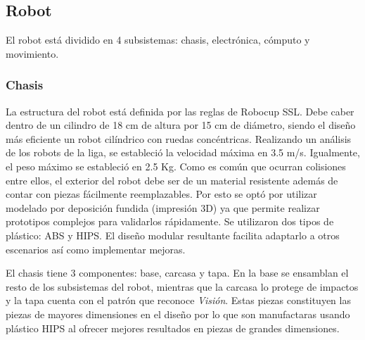 \documentclass[twocolumn,10pt]{amrob}
\begin{document}
\subsection*{Robot}
\label{subsec:partes_robot}
El robot está dividido en 4 subsistemas: chasis, electrónica, cómputo y movimiento.

\subsubsection*{Chasis}
La estructura del robot está definida por las reglas de Robocup SSL. Debe caber dentro de un cilindro de 18 cm de altura por 15 cm de diámetro, siendo el diseño más eficiente un robot cilíndrico con ruedas concéntricas.
Realizando un análisis de los robots de la liga, se estableció la velocidad máxima en 3.5 m/s. Igualmente, el peso máximo se estableció en 2.5 Kg. Como es común que ocurran colisiones entre ellos, el exterior del robot debe ser de un material resistente además de contar con piezas fácilmente reemplazables. Por esto se optó por utilizar modelado por deposición fundida (impresión 3D) ya que permite realizar prototipos complejos para validarlos rápidamente. Se utilizaron dos tipos de plástico: ABS y HIPS. El diseño modular resultante facilita adaptarlo a otros escenarios así como implementar mejoras. 

El chasis tiene 3 componentes: base, carcasa y tapa. En la base se ensamblan el resto de los subsistemas del robot, mientras que la carcasa lo protege de impactos y la tapa cuenta con el patrón que reconoce \emph{Visión}. Estas piezas constituyen las piezas de mayores dimensiones en el diseño por lo que son manufactaras usando plástico HIPS al ofrecer mejores resultados en piezas de grandes dimensiones. 
\end{document}
